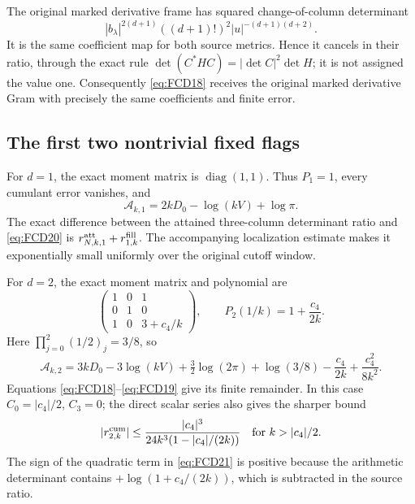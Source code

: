 \documentclass[11pt]{article}
\begin{document}
The original marked derivative frame has squared change-of-column
determinant
\[
 |b_\lambda|^{2(d+1)}((d+1)!)^2
                  |u|^{-(d+1)(d+2)} .
\]
It is the same coefficient map for both source metrics. Hence it cancels
in their ratio, through the exact rule
\(\det(C^*HC)=|\det C|^2\det H\); it is not assigned the value one.
Consequently \eqref{eq:FCD18} receives the original marked derivative
Gram with precisely the same coefficients and finite error.

\subsection{The first two nontrivial fixed flags}

For \(d=1\), the exact moment matrix is \(\operatorname{diag}(1,1)\).
Thus \(P_1=1\), every cumulant error vanishes, and
\begin{equation}
 \mathcal A_{k,1}=2kD_0-\log(kV)+\log\pi .
 \tag{FCD20}\label{eq:FCD20}
\end{equation}
The exact difference between the attained three-column determinant
ratio and \eqref{eq:FCD20} is
\(r_{N,k,1}^{\rm att}+r_{1,k}^{\rm fill}\).
The accompanying localization estimate makes it exponentially small
uniformly over the original cutoff window.

For \(d=2\), the exact moment matrix and polynomial are
\[
 \begin{pmatrix}
 1&0&1\\
 0&1&0\\
 1&0&3+c_4/k
 \end{pmatrix},
 \qquad P_2(1/k)=1+\frac{c_4}{2k}.
\]
Here \(\prod_{j=0}^2(1/2)_j=3/8\), so
\begin{equation}
 \mathcal A_{k,2}
 =3kD_0-3\log(kV)+\tfrac32\log(2\pi)+\log(3/8)
                 -\frac{c_4}{2k}+\frac{c_4^2}{8k^2}.
 \tag{FCD21}\label{eq:FCD21}
\end{equation}
Equations \eqref{eq:FCD18}--\eqref{eq:FCD19} give its finite remainder.
In this case \(C_0=|c_4|/2\), \(C_3=0\); the direct scalar series also
gives the sharper bound
\[
 |r_{2,k}^{\rm cum}|
    \le\frac{|c_4|^3}{24k^3(1-|c_4|/(2k))}
       \quad\text{for }k>|c_4|/2 .
\]
The sign of the quadratic term in \eqref{eq:FCD21} is positive because
the arithmetic determinant contains \(+\log(1+c_4/(2k))\), which is
subtracted in the source ratio.
\end{document}
